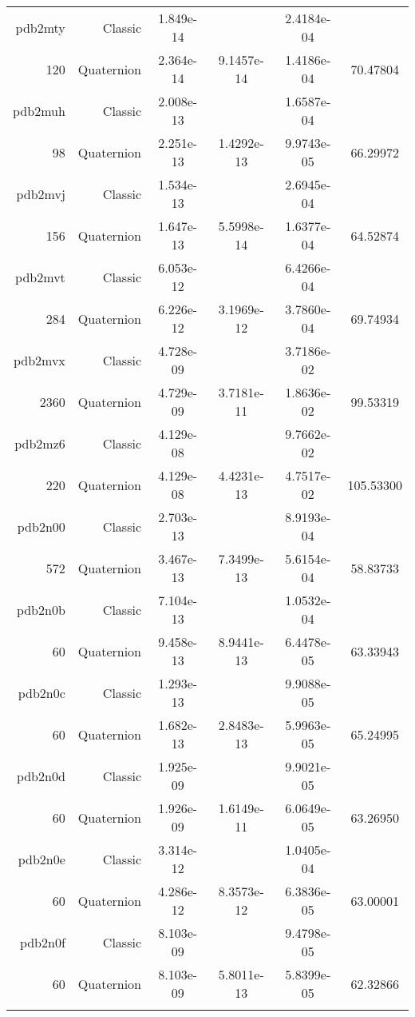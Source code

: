 \begin{xltabular}{\textwidth}{r|rS[table-format=1.3e+2]S[table-format=1.4e+2]S[table-format=1.4e+2]S[table-format=-1.5]}
pdb2mty & Classic & 1.849e-14 &  & 2.4184e-04 & \\
120 & Quaternion & 2.364e-14 & 9.1457e-14 & 1.4186e-04 & 70.47804\\  \addlinespace
pdb2muh & Classic & 2.008e-13 &  & 1.6587e-04 & \\
98 & Quaternion & 2.251e-13 & 1.4292e-13 & 9.9743e-05 & 66.29972\\  \addlinespace
pdb2mvj & Classic & 1.534e-13 &  & 2.6945e-04 & \\
156 & Quaternion & 1.647e-13 & 5.5998e-14 & 1.6377e-04 & 64.52874\\  \addlinespace
pdb2mvt & Classic & 6.053e-12 &  & 6.4266e-04 & \\
284 & Quaternion & 6.226e-12 & 3.1969e-12 & 3.7860e-04 & 69.74934\\  \addlinespace
pdb2mvx & Classic & 4.728e-09 &  & 3.7186e-02 & \\
2360 & Quaternion & 4.729e-09 & 3.7181e-11 & 1.8636e-02 & 99.53319\\  \addlinespace
pdb2mz6 & Classic & 4.129e-08 &  & 9.7662e-02 & \\
220 & Quaternion & 4.129e-08 & 4.4231e-13 & 4.7517e-02 & 105.53300\\  \addlinespace
pdb2n00 & Classic & 2.703e-13 &  & 8.9193e-04 & \\
572 & Quaternion & 3.467e-13 & 7.3499e-13 & 5.6154e-04 & 58.83733\\  \addlinespace
pdb2n0b & Classic & 7.104e-13 &  & 1.0532e-04 & \\
60 & Quaternion & 9.458e-13 & 8.9441e-13 & 6.4478e-05 & 63.33943\\  \addlinespace
pdb2n0c & Classic & 1.293e-13 &  & 9.9088e-05 & \\
60 & Quaternion & 1.682e-13 & 2.8483e-13 & 5.9963e-05 & 65.24995\\  \addlinespace
pdb2n0d & Classic & 1.925e-09 &  & 9.9021e-05 & \\
60 & Quaternion & 1.926e-09 & 1.6149e-11 & 6.0649e-05 & 63.26950\\  \addlinespace
pdb2n0e & Classic & 3.314e-12 &  & 1.0405e-04 & \\
60 & Quaternion & 4.286e-12 & 8.3573e-12 & 6.3836e-05 & 63.00001\\  \addlinespace
pdb2n0f & Classic & 8.103e-09 &  & 9.4798e-05 & \\
60 & Quaternion & 8.103e-09 & 5.8011e-13 & 5.8399e-05 & 62.32866\\  \addlinespace

\end{xltabular}
